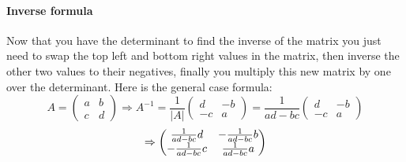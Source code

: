 \documentclass{article}
\begin{document}
\paragraph{Inverse formula}
Now that you have the determinant to find the inverse of the matrix you just need to swap the top left and bottom right values in the matrix, then inverse the other two values to their negatives, finally you multiply this new matrix by one over the determinant. Here is the general case formula:
\[
	A = 
	\begin{pmatrix}
		a & b\\
		c & d
	\end{pmatrix}
	\Rightarrow
	A^{-1} = \frac{1}{|A|}
	\begin{pmatrix}
		d & -b\\
		-c & a
	\end{pmatrix}
	=
	\frac{1}{ad-bc}
	\begin{pmatrix}
		d & -b\\
		-c & a
	\end{pmatrix}
\]
\[
	\vspace{0.5cm}
	\Rightarrow
	\begin{pmatrix}
		\frac{1}{ad-bc}d & -\frac{1}{ad-bc}b\\
		-\frac{1}{ad-bc}c & \frac{1}{ad-bc}a
	\end{pmatrix}
\]
\end{document}
